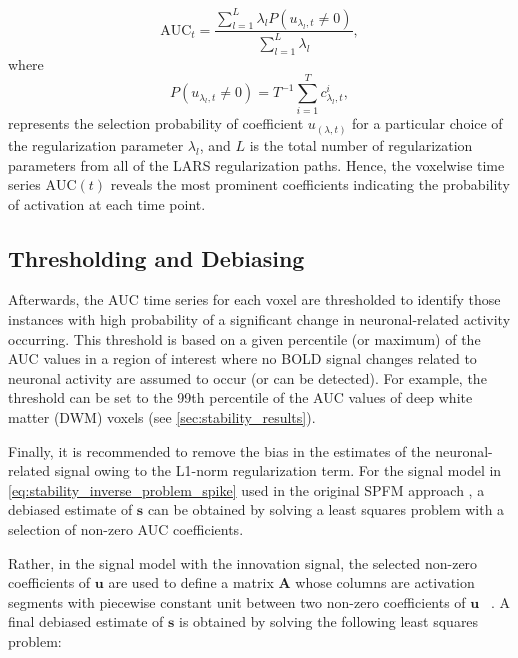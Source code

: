 \begin{equation}
    \text{AUC}_t = \frac{\sum_{l=1}^L \lambda_l P\left( u_{\lambda_l,t} \neq 0 \right)}{\sum_{l=1}^L \lambda_l},
    \label{eq:stability_auc}
\end{equation}
where 
\begin{equation}
    P\left( u_{\lambda_l,t} \neq 0 \right) = T^{-1} \sum_{i=1}^T c_{\lambda_l,t}^i,
    \label{eq:stability_auc_2}
\end{equation} 
represents the selection probability of coefficient
$u_(\lambda,t)$ for a particular choice of the regularization parameter
$\lambda_l$, and $L$ is the total number of regularization parameters from all
of the LARS regularization paths. Hence, the voxelwise time series
$\text{AUC}(t)$ reveals the most prominent coefficients indicating the
probability of activation at each time point.

\subsection{Thresholding and Debiasing}

Afterwards, the AUC time series for each voxel are thresholded to identify those
instances with high probability of a significant change in neuronal-related
activity occurring. This threshold is based on a given percentile (or maximum)
of the AUC values in a region of interest where no BOLD signal changes related
to neuronal activity are assumed to occur (or can be detected). For example,
the threshold can be set to the 99th percentile of the AUC values of deep white
matter (DWM) voxels (see \cref{sec:stability_results}). 

Finally, it is recommended to remove the bias in the estimates of the neuronal-related signal
owing to the L1-norm regularization term. For the signal model in
\cref{eq:stability_inverse_problem_spike} used in the original SPFM approach
\citep{Gaudes2013Paradigmfreemapping}, a debiased estimate of $\mathbf{s}$ can
be obtained by solving a least squares problem with a selection of
non-zero AUC coefficients.

Rather, in the signal model with the innovation signal, the selected non-zero
coefficients of $\mathbf{u}$ are used to define a matrix $\mathbf{A}$ whose
columns are activation segments with piecewise constant unit between two
non-zero coefficients of $\mathbf{u}$ ~\citep{Zoller2019RobustRecoveryTemporal}.
A final debiased estimate of $\mathbf{s}$ is obtained by solving the following
least squares problem:

